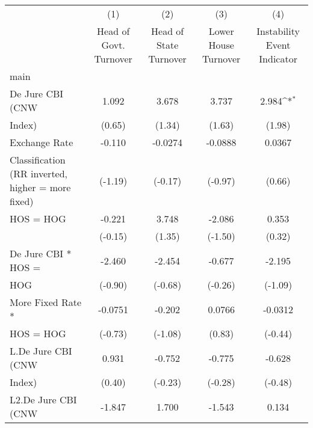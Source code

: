 {
\def\sym#1{\ifmmode^{#1}\else\(^{#1}\)\fi}
\begin{tabular}{l*{4}{c}}
\hline\hline
                    &\multicolumn{1}{c}{(1)}&\multicolumn{1}{c}{(2)}&\multicolumn{1}{c}{(3)}&\multicolumn{1}{c}{(4)}\\
                    &\multicolumn{1}{c}{Head of Govt. Turnover}&\multicolumn{1}{c}{Head of State Turnover}&\multicolumn{1}{c}{Lower House Turnover}&\multicolumn{1}{c}{Instability Event Indicator}\\
\hline
main                &                     &                     &                     &                     \\
De Jure CBI (CNW    &       1.092         &       3.678         &       3.737         &       2.984\sym{*}  \\
Index)              &      (0.65)         &      (1.34)         &      (1.63)         &      (1.98)         \\
[1em]
Exchange Rate       &      -0.110         &     -0.0274         &     -0.0888         &      0.0367         \\
Classification (RR inverted, higher = more fixed)&     (-1.19)         &     (-0.17)         &     (-0.97)         &      (0.66)         \\
[1em]
HOS = HOG           &      -0.221         &       3.748         &      -2.086         &       0.353         \\
                    &     (-0.15)         &      (1.35)         &     (-1.50)         &      (0.32)         \\
[1em]
De Jure CBI * HOS = &      -2.460         &      -2.454         &      -0.677         &      -2.195         \\
HOG                 &     (-0.90)         &     (-0.68)         &     (-0.26)         &     (-1.09)         \\
[1em]
More Fixed Rate *   &     -0.0751         &      -0.202         &      0.0766         &     -0.0312         \\
HOS = HOG           &     (-0.73)         &     (-1.08)         &      (0.83)         &     (-0.44)         \\
[1em]
L.De Jure CBI (CNW  &       0.931         &      -0.752         &      -0.775         &      -0.628         \\
Index)              &      (0.40)         &     (-0.23)         &     (-0.28)         &     (-0.48)         \\
[1em]
L2.De Jure CBI (CNW &      -1.847         &       1.700         &      -1.543         &       0.134         \\

\end{tabular}}
